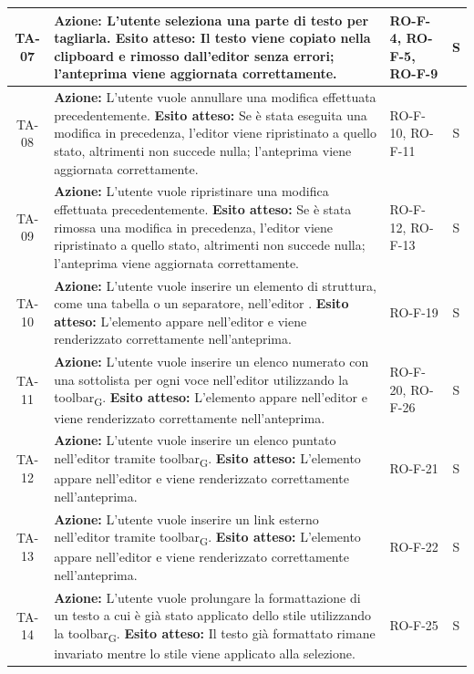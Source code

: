 \documentclass[11pt,a4paper]{article}
\newcommand{\gls}[1]{#1\textsubscript{G}}
\begin{document}
\begin{longtable}{|c|p{9cm}|p{3cm}|c|}
\hline
TA-07 & \textbf{Azione:} L'utente seleziona una parte di testo per tagliarla. \newline \textbf{Esito atteso:} Il testo viene copiato nella clipboard e rimosso dall'editor senza errori; l'anteprima viene aggiornata correttamente. & RO-F-4, RO-F-5, RO-F-9  & S \\
\hline
TA-08 & \textbf{Azione:} L'utente vuole annullare una modifica effettuata precedentemente. \newline \textbf{Esito atteso:} Se è stata eseguita una modifica in precedenza, l'editor viene ripristinato a quello stato, altrimenti non succede nulla; l'anteprima viene aggiornata correttamente. & RO-F-10, RO-F-11  & S \\
\hline
TA-09 & \textbf{Azione:} L'utente vuole ripristinare una modifica effettuata precedentemente. \newline \textbf{Esito atteso:} Se è stata rimossa una modifica in precedenza, l'editor viene ripristinato a quello stato, altrimenti non succede nulla; l'anteprima viene aggiornata correttamente. & RO-F-12, RO-F-13  & S \\
\hline
TA-10 & \textbf{Azione:} L'utente vuole inserire un elemento di struttura, come una tabella o un separatore, nell'editor . \newline \textbf{Esito atteso:} L'elemento appare nell'editor e viene renderizzato correttamente nell'anteprima. & RO-F-19  & S \\
\hline
TA-11 & \textbf{Azione:} L'utente vuole inserire un elenco numerato con una sottolista per ogni voce nell'editor utilizzando la \gls{toolbar}. \newline \textbf{Esito atteso:} L'elemento appare nell'editor e viene renderizzato correttamente nell'anteprima. & RO-F-20, RO-F-26  & S \\
\hline
TA-12 & \textbf{Azione:} L'utente vuole inserire un elenco puntato nell'editor tramite \gls{toolbar}. \newline \textbf{Esito atteso:} L'elemento appare nell'editor e viene renderizzato correttamente nell'anteprima. & RO-F-21  & S \\
\hline
TA-13 & \textbf{Azione:} L'utente vuole inserire un link esterno nell'editor tramite \gls{toolbar}. \newline \textbf{Esito atteso:} L'elemento appare nell'editor e viene renderizzato correttamente nell'anteprima. & RO-F-22  & S \\
\hline
TA-14 & \textbf{Azione:} L'utente vuole prolungare la formattazione di un testo a cui è già stato applicato dello stile utilizzando la \gls{toolbar}. \newline \textbf{Esito atteso:} Il testo già formattato rimane invariato mentre lo stile viene applicato alla selezione. & RO-F-25  & S \\

\end{longtable}
\end{document}
